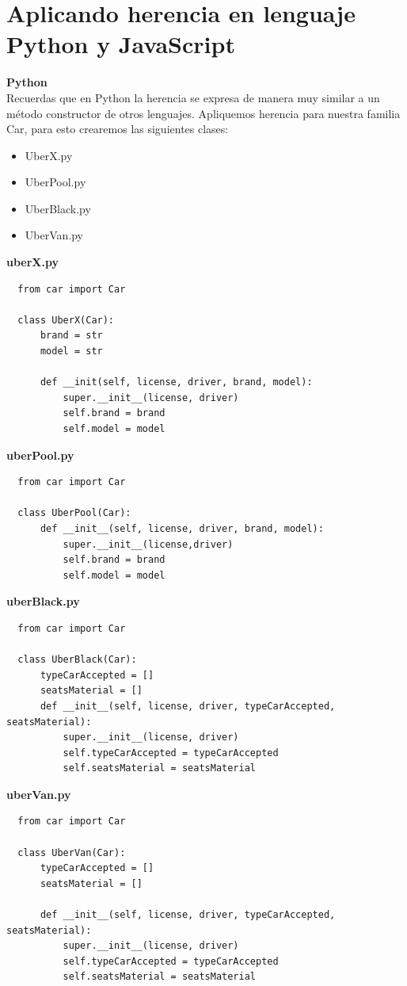 \documentclass{article}
\begin{document}

\section{Aplicando herencia en lenguaje Python y JavaScript}%
\textbf{Python}\\

Recuerdas que en Python la herencia se expresa de manera muy similar a un
método constructor de otros lenguajes. Apliquemos herencia para nuestra familia
Car, para esto crearemos las siguientes clases:\\

\begin{itemize}
  \item UberX.py
  \item UberPool.py
  \item UberBlack.py
  \item UberVan.py
\end{itemize}

\textbf{uberX.py}
\begin{verbatim}
  from car import Car

  class UberX(Car):
      brand = str
      model = str

      def __init(self, license, driver, brand, model):
          super.__init__(license, driver)
          self.brand = brand
          self.model = model
\end{verbatim}

\textbf{uberPool.py}
\begin{verbatim}
  from car import Car

  class UberPool(Car):
      def __init__(self, license, driver, brand, model):
          super.__init__(license,driver)
          self.brand = brand
          self.model = model
\end{verbatim}

\textbf{uberBlack.py}
\begin{verbatim}
  from car import Car

  class UberBlack(Car):
      typeCarAccepted = []
      seatsMaterial = []
      def __init__(self, license, driver, typeCarAccepted, seatsMaterial):
          super.__init__(license, driver)
          self.typeCarAccepted = typeCarAccepted
          self.seatsMaterial = seatsMaterial
\end{verbatim}

\textbf{uberVan.py}
\begin{verbatim}
  from car import Car

  class UberVan(Car):
      typeCarAccepted = []
      seatsMaterial = []

      def __init__(self, license, driver, typeCarAccepted, seatsMaterial):
          super.__init__(license, driver)
          self.typeCarAccepted = typeCarAccepted
          self.seatsMaterial = seatsMaterial
\end{verbatim}
\end{document}
